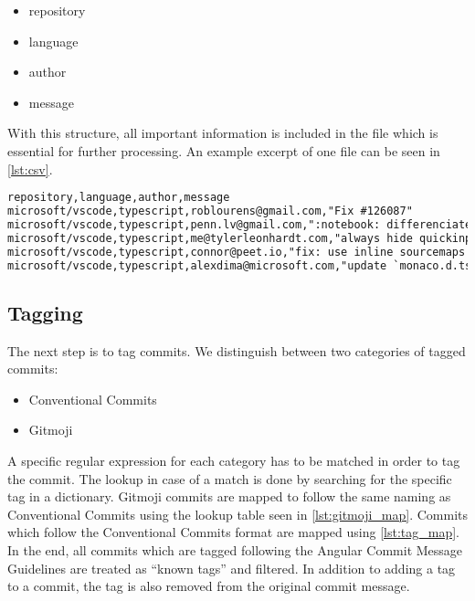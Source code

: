 \begin{itemize}
  \item repository
  \item language
  \item author
  \item message
\end{itemize}

With this structure, all important information is included in the file which is
essential for further processing. An example excerpt of one file can be seen in
\autoref{lst:csv}.

\begin{lstlisting}[language=xml, label={lst:csv}, caption={Excerpt of \texttt{typescript.csv} with commits from the repository \texttt{microsoft/vscode}}]
repository,language,author,message
microsoft/vscode,typescript,roblourens@gmail.com,"Fix #126087"
microsoft/vscode,typescript,penn.lv@gmail.com,":notebook: differenciate editor focus and list view focus"
microsoft/vscode,typescript,me@tylerleonhardt.com,"always hide quickinput on iPad when focus is lost fixes #125284"
microsoft/vscode,typescript,connor@peet.io,"fix: use inline sourcemaps in watch task"
microsoft/vscode,typescript,alexdima@microsoft.com,"update `monaco.d.ts`"
\end{lstlisting}

\subsection{Tagging}

The next step is to tag commits. We distinguish between two categories of tagged
commits:

\begin{itemize}
  \item Conventional Commits \cite{conventionalcommits}
  \item Gitmoji \cite{gitmoji}
\end{itemize}

A specific regular expression for each category has to be matched in order to
tag the commit. The lookup in case of a match is done by searching for the
specific tag in a dictionary. Gitmoji commits are mapped to follow the same naming
as Conventional Commits using the lookup table seen in \autoref{lst:gitmoji_map}.
Commits which follow the Conventional Commits format are mapped using \autoref{lst:tag_map}.
In the end, all commits which are tagged following the Angular Commit Message
Guidelines \cite{angular_guidelines} are treated as “known tags” and filtered.
In addition to adding a tag to a commit, the tag is also removed from the original
commit message.

